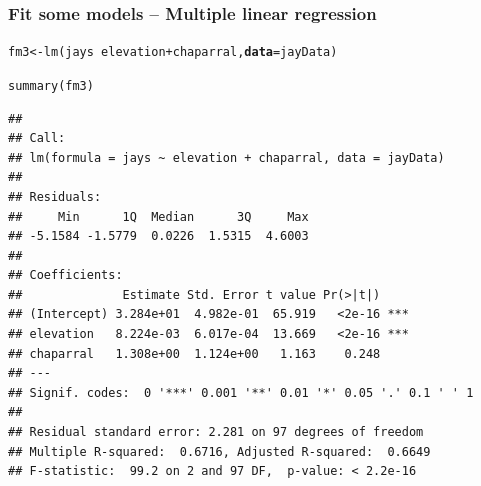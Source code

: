 \documentclass[color=usenames,dvipsnames]{beamer}\usepackage[]{graphicx}\usepackage[]{color}
\makeatletter
\newcommand{\hlopt}[1]{\textcolor[rgb]{0,0,0}{#1}}%
\newcommand{\hlstd}[1]{\textcolor[rgb]{0,0,0}{#1}}%
\newcommand{\hlkwb}[1]{\textcolor[rgb]{0,0.341,0.682}{#1}}%
\newcommand{\hlkwc}[1]{\textcolor[rgb]{0,0,0}{\textbf{#1}}}%
\newcommand{\hlkwd}[1]{\textcolor[rgb]{0.004,0.004,0.506}{#1}}%
\newenvironment{kframe}{%
 \def\at@end@of@kframe{}%
 \ifinner\ifhmode%
  \def\at@end@of@kframe{\end{minipage}}%
  \begin{minipage}{\columnwidth}%
 \fi\fi%
 \def\FrameCommand##1{\hskip\@totalleftmargin \hskip-\fboxsep
 \colorbox{shadecolor}{##1}\hskip-\fboxsep
     \hskip-\linewidth \hskip-\@totalleftmargin \hskip\columnwidth}%
 \MakeFramed {\advance\hsize-\width
   \@totalleftmargin\z@ \linewidth\hsize
   \@setminipage}}%
 {\par\unskip\endMakeFramed%
 \at@end@of@kframe}
\newenvironment{knitrout}{}{} %
\makeatother
\begin{document}
\begin{frame}[fragile]
  \frametitle{Fit some models -- Multiple linear regression}
  \scriptsize
\begin{knitrout}\scriptsize
{}\color{fgcolor}\begin{kframe}
\begin{alltt}
\hlstd{fm3} \hlkwb{<-} \hlkwd{lm}\hlstd{(jays} \hlopt{~} \hlstd{elevation} \hlopt{+} \hlstd{chaparral,} \hlkwc{data}\hlstd{=jayData)}
\end{alltt}
\end{kframe}
\end{knitrout}
\pause
\begin{knitrout}\scriptsize
{}\color{fgcolor}\begin{kframe}
\begin{alltt}
\hlkwd{summary}\hlstd{(fm3)}
\end{alltt}
\begin{verbatim}
## 
## Call:
## lm(formula = jays ~ elevation + chaparral, data = jayData)
## 
## Residuals:
##     Min      1Q  Median      3Q     Max 
## -5.1584 -1.5779  0.0226  1.5315  4.6003 
## 
## Coefficients:
##              Estimate Std. Error t value Pr(>|t|)    
## (Intercept) 3.284e+01  4.982e-01  65.919   <2e-16 ***
## elevation   8.224e-03  6.017e-04  13.669   <2e-16 ***
## chaparral   1.308e+00  1.124e+00   1.163    0.248    
## ---
## Signif. codes:  0 '***' 0.001 '**' 0.01 '*' 0.05 '.' 0.1 ' ' 1
## 
## Residual standard error: 2.281 on 97 degrees of freedom
## Multiple R-squared:  0.6716,	Adjusted R-squared:  0.6649 
## F-statistic:  99.2 on 2 and 97 DF,  p-value: < 2.2e-16
\end{verbatim}
\end{kframe}
\end{knitrout}
\end{frame}
\end{document}
